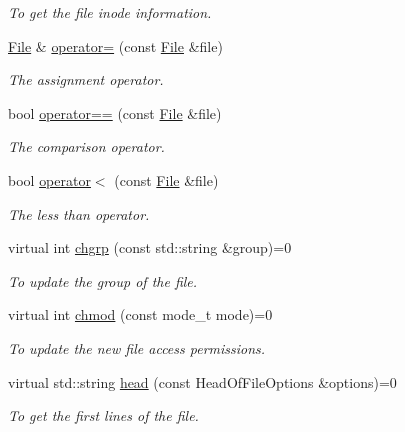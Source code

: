 \begin{DoxyCompactItemize}
\begin{DoxyCompactList}\small\item\em To get the file inode information. \item\end{DoxyCompactList}\item 
\hyperlink{classFile}{File} \& \hyperlink{classFile_a157cbcdf7a17fca90a48a0402becd296}{operator=} (const \hyperlink{classFile}{File} \&file)
\begin{DoxyCompactList}\small\item\em The assignment operator. \item\end{DoxyCompactList}\item 
bool \hyperlink{classFile_ac8357818462f976167486bb90bd7488a}{operator==} (const \hyperlink{classFile}{File} \&file)
\begin{DoxyCompactList}\small\item\em The comparison operator. \item\end{DoxyCompactList}\item 
bool \hyperlink{classFile_a7ee45a77fb229db0af307cbcbaf6a51e}{operator$<$} (const \hyperlink{classFile}{File} \&file)
\begin{DoxyCompactList}\small\item\em The less than operator. \item\end{DoxyCompactList}\item 
virtual int \hyperlink{classFile_ac49c7da7767921e6c97263ecc30cede6}{chgrp} (const std::string \&group)=0
\begin{DoxyCompactList}\small\item\em To update the group of the file. \item\end{DoxyCompactList}\item 
virtual int \hyperlink{classFile_a8d5f8ed5b3d4750df415e3f6207157fe}{chmod} (const mode\_\-t mode)=0
\begin{DoxyCompactList}\small\item\em To update the new file access permissions. \item\end{DoxyCompactList}\item 
virtual std::string \hyperlink{classFile_ab6b6465dcf91dca981e9925459744496}{head} (const HeadOfFileOptions \&options)=0
\begin{DoxyCompactList}\small\item\em To get the first lines of the file. \item\end{DoxyCompactList}\item 

\end{DoxyCompactItemize}
